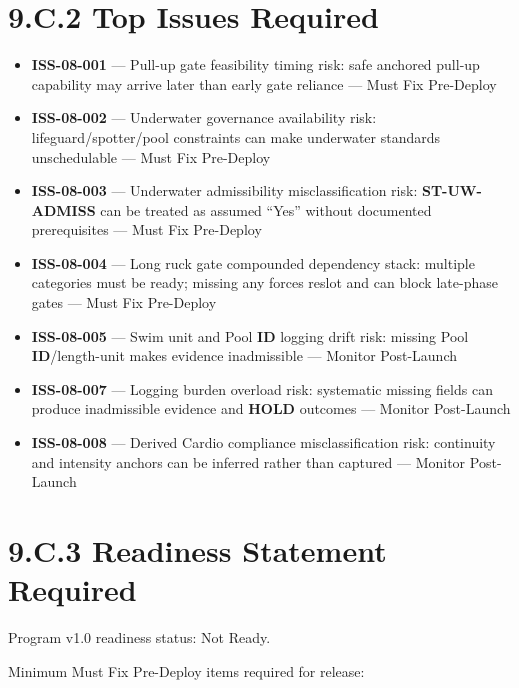 \documentclass[10pt]{article}
\begin{document}
\section*{9.C.2 Top Issues Required}
{}

\begin{itemize}
\item \textbf{ISS-08-001} — Pull-up gate feasibility timing risk: safe anchored pull-up capability may arrive later than early gate reliance — Must Fix Pre-Deploy
\item \textbf{ISS-08-002} — Underwater governance availability risk: lifeguard/spotter/pool constraints can make underwater standards unschedulable — Must Fix Pre-Deploy
\item \textbf{ISS-08-003} — Underwater admissibility misclassification risk: \textbf{ST-UW-ADMISS} can be treated as assumed “Yes” without documented prerequisites — Must Fix Pre-Deploy
\item \textbf{ISS-08-004} — Long ruck gate compounded dependency stack: multiple categories must be ready; missing any forces reslot and can block late-phase gates — Must Fix Pre-Deploy
\item \textbf{ISS-08-005} — Swim unit and Pool \textbf{ID} logging drift risk: missing Pool \textbf{ID}/length-unit makes evidence inadmissible — Monitor Post-Launch
\item \textbf{ISS-08-007} — Logging burden overload risk: systematic missing fields can produce inadmissible evidence and \textbf{HOLD} outcomes — Monitor Post-Launch
\item \textbf{ISS-08-008} — Derived Cardio compliance misclassification risk: continuity and intensity anchors can be inferred rather than captured — Monitor Post-Launch
\end{itemize}

\section*{9.C.3 Readiness Statement Required}
{}

Program v1.0 readiness status: Not Ready.

Minimum Must Fix Pre-Deploy items required for release:
\end{document}
